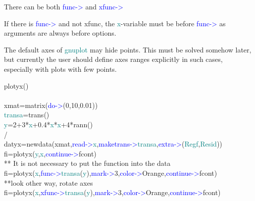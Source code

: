 \begin{note} 
There can be both \textcolor{blue}{func->} and \textcolor{blue}{xfunc->} 
\end{note} 
\begin{note} 
If there is \textcolor{blue}{func->} and not xfunc, the \textcolor{teal}{x}-variable must be before \textcolor{blue}{func->} 
as arguments are always before options. 
\end{note} 
\begin{note} 
The default axes of \textcolor{teal}{gnuplot} may hide points. This must be solved somehow later, 
but currently the user should define axes ranges explicitly in such cases, especially with plots with few 
points. 
\end{note} 
\singlespacing 
\begin{example}[plotyxex]plotyx()\\ 
\label{plotyxex} 
\\ 
xmat=\textcolor{VioletRed}{matrix}(\textcolor{blue}{do->}(0,10,0.01))\\ 
\textcolor{teal}{transa}=\textcolor{VioletRed}{trans}()\\ 
\textcolor{teal}{y}=2+3*\textcolor{teal}{x}+0.4*\textcolor{teal}{x}*\textcolor{teal}{x}+4*\textcolor{VioletRed}{rann}()\\ 
/                                                                                                                      \\ 
datyx=\textcolor{VioletRed}{newdata}(xmat,\textcolor{blue}{read->}\textcolor{teal}{x},\textcolor{blue}{maketrans->}\textcolor{teal}{transa},\textcolor{blue}{extra->}(\textcolor{teal}{Regf},\textcolor{teal}{Resid}))\\ 
fi=\textcolor{VioletRed}{plotyx}(\textcolor{teal}{y},\textcolor{teal}{x},\textcolor{blue}{continue->}fcont)\\ 
{\color{ForestGreen}** It is not necessary to put the function into the data}\\ 
fi=\textcolor{VioletRed}{plotyx}(\textcolor{teal}{x},\textcolor{blue}{func->}\textcolor{teal}{transa}(\textcolor{teal}{y}),\textcolor{blue}{mark->}3,\textcolor{blue}{color->}Orange,\textcolor{blue}{continue->}fcont)\\ 
{\color{ForestGreen}**look other way, rotate axes}\\ 
fi=\textcolor{VioletRed}{plotyx}(\textcolor{teal}{x},\textcolor{blue}{xfunc->}\textcolor{teal}{transa}(\textcolor{teal}{y}),\textcolor{blue}{mark->}3,\textcolor{blue}{color->}Orange,\textcolor{blue}{continue->}fcont)\\ 

\end{example}
